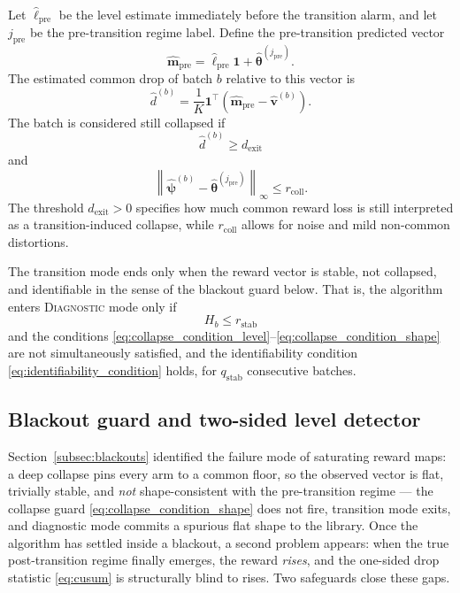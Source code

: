 \documentclass[11pt]{article}
\newcommand{\one}{\bm 1}
\newcommand{\norm}[1]{\left\lVert #1 \right\rVert}
\begin{document}
Let $\widehat\ell_{\mathrm{pre}}$ be the level estimate immediately before the transition alarm, and let $j_{\mathrm{pre}}$ be the pre-transition regime label. Define the pre-transition predicted vector
\begin{equation}
\label{eq:pre_transition_vector}
\widehat{\bm m}_{\mathrm{pre}}
=
\widehat\ell_{\mathrm{pre}}\one+\widehat{\bm\theta}^{(j_{\mathrm{pre}})}.
\end{equation}
The estimated common drop of batch $b$ relative to this vector is
\begin{equation}
\label{eq:estimated_common_drop}
\widehat d^{(b)}
=
\frac{1}{K}\one^\top
\left(
\widehat{\bm m}_{\mathrm{pre}}-\widehat{\bm v}^{(b)}
\right).
\end{equation}
The batch is considered still collapsed if
\begin{equation}
\label{eq:collapse_condition_level}
\widehat d^{(b)}\geq d_{\mathrm{exit}}
\end{equation}
and
\begin{equation}
\label{eq:collapse_condition_shape}
\norm{\widehat{\bm\psi}^{(b)}-
\widehat{\bm\theta}^{(j_{\mathrm{pre}})}}_{\infty}
\leq r_{\mathrm{coll}}.
\end{equation}
The threshold $d_{\mathrm{exit}}>0$ specifies how much common reward loss is still interpreted as a transition-induced collapse, while $r_{\mathrm{coll}}$ allows for noise and mild non-common distortions.

The transition mode ends only when the reward vector is stable, not collapsed, and identifiable in the sense of the blackout guard below. That is, the algorithm enters \textsc{Diagnostic} mode only if
\begin{equation}
\label{eq:transition_exit_condition}
H_b\leq r_{\mathrm{stab}}
\end{equation}
and the conditions \eqref{eq:collapse_condition_level}--\eqref{eq:collapse_condition_shape} are not simultaneously satisfied, and the identifiability condition \eqref{eq:identifiability_condition} holds, for $q_{\mathrm{stab}}$ consecutive batches.

\subsection{Blackout guard and two-sided level detector}
\label{subsec:blackout_guard}

Section~\ref{subsec:blackouts} identified the failure mode of saturating reward maps: a deep collapse pins every arm to a common floor, so the observed vector is flat, trivially stable, and \emph{not} shape-consistent with the pre-transition regime --- the collapse guard \eqref{eq:collapse_condition_shape} does not fire, transition mode exits, and diagnostic mode commits a spurious flat shape to the library. Once the algorithm has settled inside a blackout, a second problem appears: when the true post-transition regime finally emerges, the reward \emph{rises}, and the one-sided drop statistic \eqref{eq:cusum} is structurally blind to rises. Two safeguards close these gaps.
\end{document}
